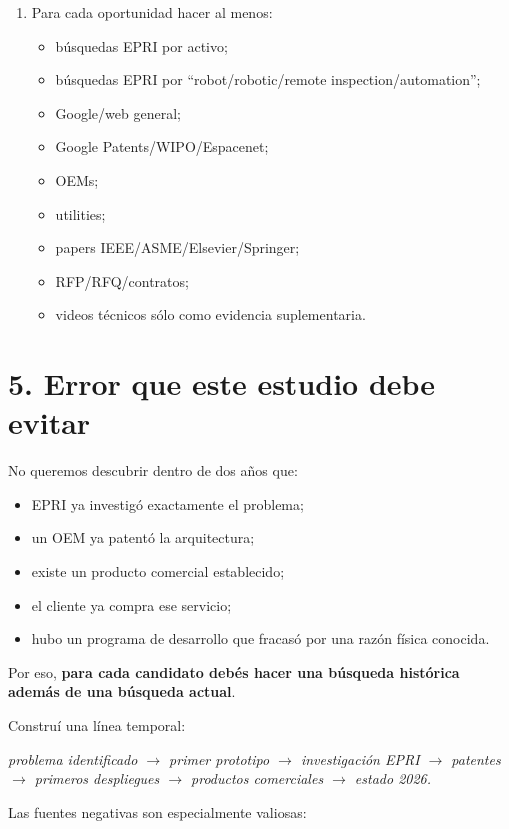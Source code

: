 \documentclass[11pt,a4paper]{article}
\newenvironment{callout}
  {\par\medskip\noindent
   \begin{lrbox}{\calloutbox}%
   \begin{minipage}{\dimexpr\linewidth-2.2em\relax}\itshape}
  {\end{minipage}\end{lrbox}%
   \noindent{\color{accent}\vrule width 2.5pt}\hspace{0.6em}%
   \colorbox{calloutbg}{\usebox{\calloutbox}}\par\medskip}
\begin{document}
\begin{enumerate}
Empresas importantes pueden no estar bien indexadas en búsquedas en inglés.
\item Para cada oportunidad hacer al menos:
\begin{itemize}
\item búsquedas EPRI por activo;
\item búsquedas EPRI por ``robot/robotic/remote inspection/automation'';
\item Google/web general;
\item Google Patents/WIPO/Espacenet;
\item OEMs;
\item utilities;
\item papers IEEE/ASME/Elsevier/Springer;
\item RFP/RFQ/contratos;
\item videos técnicos sólo como evidencia suplementaria.
\end{itemize}
\end{enumerate}


\section*{5. Error que este estudio debe evitar}
No queremos descubrir dentro de dos años que:

\begin{itemize}
\item EPRI ya investigó exactamente el problema;
\item un OEM ya patentó la arquitectura;
\item existe un producto comercial establecido;
\item el cliente ya compra ese servicio;
\item hubo un programa de desarrollo que fracasó por una razón física conocida.
\end{itemize}

Por eso, \textbf{para cada candidato debés hacer una búsqueda histórica además de una búsqueda actual}.

Construí una línea temporal:

\begin{callout}
problema identificado $\rightarrow$ primer prototipo $\rightarrow$ investigación EPRI $\rightarrow$ patentes $\rightarrow$ primeros despliegues $\rightarrow$ productos comerciales $\rightarrow$ estado 2026.
\end{callout}

Las fuentes negativas son especialmente valiosas:
\end{document}

